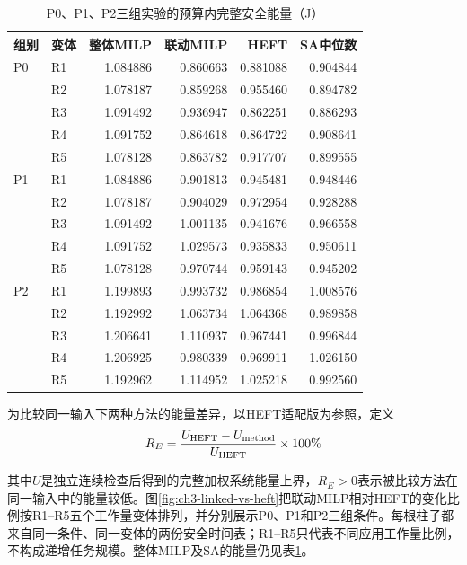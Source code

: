 \begin{table}[htbp]
\centering
\small
\caption{P0、P1、P2三组实验的预算内完整安全能量（J）}
\label{tab:exp-energy}
\begin{tabular}{llrrrr}
\toprule
组别 & 变体 & 整体MILP & 联动MILP & HEFT & SA中位数 \\
\midrule
P0 & R1 & 1.084886 & 0.860663 & 0.881088 & 0.904844 \\
   & R2 & 1.078187 & 0.859268 & 0.955460 & 0.894782 \\
   & R3 & 1.091492 & 0.936947 & 0.862251 & 0.886293 \\
   & R4 & 1.091752 & 0.864618 & 0.864722 & 0.908641 \\
   & R5 & 1.078128 & 0.863782 & 0.917707 & 0.899555 \\
\midrule
P1 & R1 & 1.084886 & 0.901813 & 0.945481 & 0.948446 \\
   & R2 & 1.078187 & 0.904029 & 0.972954 & 0.928288 \\
   & R3 & 1.091492 & 1.001135 & 0.941676 & 0.966558 \\
   & R4 & 1.091752 & 1.029573 & 0.935833 & 0.950611 \\
   & R5 & 1.078128 & 0.970744 & 0.959143 & 0.945202 \\
\midrule
P2 & R1 & 1.199893 & 0.993732 & 0.986854 & 1.008576 \\
   & R2 & 1.192992 & 1.063734 & 1.064368 & 0.989858 \\
   & R3 & 1.206641 & 1.110937 & 0.967441 & 0.996844 \\
   & R4 & 1.206925 & 0.980339 & 0.969911 & 1.026150 \\
   & R5 & 1.192962 & 1.114952 & 1.025218 & 0.992560 \\
\bottomrule
\end{tabular}
\end{table}

为比较同一输入下两种方法的能量差异，以HEFT适配版为参照，定义
\begin{equation}
 R_E=\frac{U_{\rm HEFT}-U_{\rm method}}{U_{\rm HEFT}}\times100\%
 \label{eq:exp-saving}
\end{equation}

其中$U$是独立连续检查后得到的完整加权系统能量上界，$R_E>0$表示被比较方法在同一输入中的能量较低。图\ref{fig:ch3-linked-vs-heft}把联动MILP相对HEFT的变化比例按R1--R5五个工作量变体排列，并分别展示P0、P1和P2三组条件。每根柱子都来自同一条件、同一变体的两份安全时间表；R1--R5只代表不同应用工作量比例，不构成递增任务规模。整体MILP及SA的能量仍见表\ref{tab:exp-energy}。

